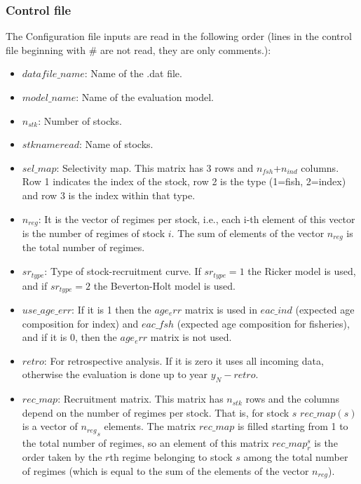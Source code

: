 \documentclass{article}
\begin{document}
\subsubsection{Control file} \label{ch:controlfile}
The Configuration file inputs are read in the following order (lines in the control file beginning with \# are not read, they are only comments.):
\begin{itemize}
    \item $datafile\_name$: Name of the .dat file.
    \item $model\_name$: Name of the evaluation model. 
    \item $n_{stk}$: Number of stocks.
    \item $stknameread$: Name of stocks.
    \item $sel\_map$: Selectivity map. This matrix has 3 rows and $n_{fsh}$+$n_{ind}$ columns. Row 1 indicates the index of the stock, row 2 is the type (1=fish, 2=index) and row 3 is the index within that type.
    \item $n_{reg}$:  It is the vector of regimes per stock, i.e., each i-th element of this vector is the number of regimes of stock $i$. The sum of elements of the vector $n_{reg}$ is the total number of regimes.
    \item $sr_{type}$:  Type of stock-recruitment curve. If $sr_{type}=1$ the Ricker model is used, and if $sr_{type}=2$ the Beverton-Holt model is used.
    \item $use\_age\_err$: If it is 1 then the $age_err$ matrix is used in $eac\_ind$ (expected age composition for index) and $eac\_fsh$ (expected age composition for fisheries), and if it is 0, then the $age_err$ matrix is not used.
    \item $retro$: For retrospective analysis. If it is zero it uses all incoming data, otherwise the evaluation is done up to year $y_N - retro$.
    \item $rec\_map$: Recruitment matrix. This matrix has $n_{stk}$ rows and the columns depend on the number of regimes per stock.  That is, for stock $s$ $rec\_map(s)$ is a vector of ${n_{reg}}_{s}$ elements. The matrix $rec\_map$ is filled starting from 1 to the total number of regimes, so an element of this matrix $rec\_map^s_r$ is the order taken by the $r$th regime belonging to stock $s$ among the total number of regimes (which is equal to the sum of the elements of the vector $n_{reg}$).

\end{itemize}
\end{document}
